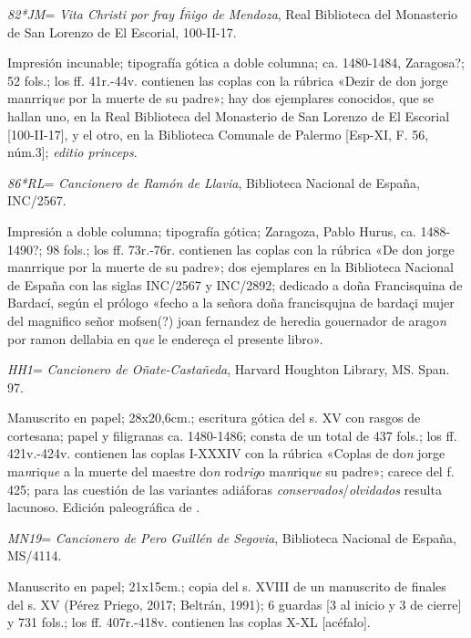 \documentclass[11pt,a4paper,twoside]{article}
\newcommand{\comillas}[1]{«#1»}
\begin{document}
\textit{82*JM}= \textit{Vita Christi por fray Íñigo de Mendoza}, Real Biblioteca del Monasterio de San Lorenzo de El Escorial, 100-II-17.

Impresión incunable; tipografía gótica a doble columna; ca. 1480-1484, Zaragosa?; 52 fols.; los ff. 41r.-44v. contienen las coplas con la rúbrica \comillas{Dezir de don jorge manrriq\textit{ue} por la muerte de su padre}; hay dos ejemplares conocidos, que se hallan uno, en la Real Biblioteca del Monasterio de San Lorenzo de El Escorial [100-II-17], y el otro, en la Biblioteca Comunale de Palermo [Esp-XI, F. 56, núm.3]; \textit{editio princeps}.\vspace{5pt}

\textit{86*RL}= \textit{Cancionero de Ramón de Llavia}, Biblioteca Nacional de España, INC/2567.

Impresión a doble columna; tipografía gótica; Zaragoza, Pablo Hurus, ca. 1488-1490?; 98 fols.; los ff. 73r.-76r. contienen las coplas con la rúbrica \comillas{De don jorge manrrique por la muerte de su padre}; dos ejemplares en la Biblioteca Nacional de España con las siglas INC/2567 y INC/2892; dedicado a doña Francisquina de Bardací, según el prólogo \comillas{fecho a la señora doña francisqujna de bardaçi mujer del magnifico señor mofsen(?) joan fernandez de heredia gouernador de arago\textit{n} por ramon dellabia en q\textit{ue} le endereça el presente libro}.\vspace{5pt}

\textit{HH1}= \textit{Cancionero de Oñate-Castañeda}, Harvard Houghton Library, MS. Span. 97.

Manuscrito en papel; 28x20,6cm.; escritura gótica del s. XV con rasgos de cortesana; papel y filigranas ca. 1480-1486; consta de un total de 437 fols.; los ff. 421v.-424v. contienen las coplas I-XXXIV con la rúbrica \comillas{Coplas de do\textit{n} jorge ma\textit{n}riq\textit{ue} a la muerte del maestre do\textit{n} rod\textit{rig}o ma\textit{n}riq\textit{ue} su padre}; carece del f. 425; para las cuestión de las variantes adiáforas \textit{conservados}/\textit{olvidados} resulta lacunoso. Edición paleográfica de \textcite{Severin1990}.\vspace{5pt} 

\textit{MN19}= \textit{Cancionero de Pero Guillén de Segovia}, Biblioteca Nacional de España, MS/4114.

Manuscrito en papel; 21x15cm.; copia del s. XVIII de un manuscrito de finales del s. XV (Pérez Priego, 2017; Beltrán, 1991); 6 guardas [3 al inicio y 3 de cierre] y 731 fols.; los ff. 407r.-418v. contienen las coplas X-XL [acéfalo].\vspace{5pt}
\end{document}
